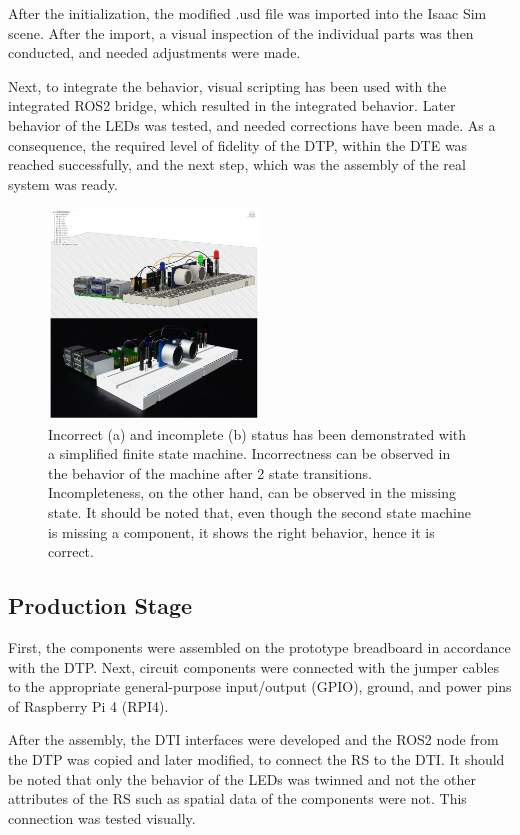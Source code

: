 \documentclass[conference]{IEEEtran}
\begin{document}
    After the initialization, the modified .usd file was imported into the Isaac Sim scene. After the import, a visual inspection of the individual 
    parts was then conducted, and needed adjustments were made. 

    Next, to integrate the behavior, visual scripting has been used with the integrated ROS2 bridge, which resulted in the integrated behavior. 
    Later behavior of the LEDs was tested, and needed corrections have been made. As a consequence, the required level of fidelity of the DTP, within the DTE 
    was reached successfully, and the next step, which was the assembly of the real system was ready.

    
    \begin{figure}[htbp]
        \centering
        \includegraphics[width=0.5\textwidth]{Left.png}
        \caption{Incorrect (a) and incomplete (b) status has been demonstrated with a simplified finite state machine. Incorrectness can be observed in the behavior 
        of the machine after 2 state transitions. Incompleteness, on the other hand, can be observed in the missing state. It should be noted that, even though the second state machine is missing a 
        component, it shows the right behavior, hence it is correct.}\label{fig:Left}
    \end{figure}

    \subsection{Production Stage}
    First, the components were assembled on the prototype breadboard in accordance with the DTP. Next, circuit components were connected with the jumper cables to the appropriate general-purpose input/output (GPIO), ground, and power pins of Raspberry Pi 4 (RPI4). 

    After the assembly, the DTI interfaces were developed and the ROS2 node from the DTP was copied and later modified, to connect the RS to the DTI. It should be noted that only the behavior of the LEDs was twinned and not the other attributes of the RS such as spatial data of the components were not. This connection was tested visually. 
\end{document}
